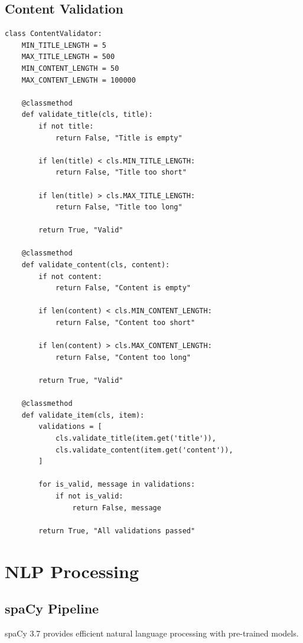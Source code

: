 \documentclass[12pt,a4paper]{report}
\begin{document}
\section{Content Validation}

\begin{lstlisting}
class ContentValidator:
    MIN_TITLE_LENGTH = 5
    MAX_TITLE_LENGTH = 500
    MIN_CONTENT_LENGTH = 50
    MAX_CONTENT_LENGTH = 100000
    
    @classmethod
    def validate_title(cls, title):
        if not title:
            return False, "Title is empty"
        
        if len(title) < cls.MIN_TITLE_LENGTH:
            return False, "Title too short"
        
        if len(title) > cls.MAX_TITLE_LENGTH:
            return False, "Title too long"
        
        return True, "Valid"
    
    @classmethod
    def validate_content(cls, content):
        if not content:
            return False, "Content is empty"
        
        if len(content) < cls.MIN_CONTENT_LENGTH:
            return False, "Content too short"
        
        if len(content) > cls.MAX_CONTENT_LENGTH:
            return False, "Content too long"
        
        return True, "Valid"
    
    @classmethod
    def validate_item(cls, item):
        validations = [
            cls.validate_title(item.get('title')),
            cls.validate_content(item.get('content')),
        ]
        
        for is_valid, message in validations:
            if not is_valid:
                return False, message
        
        return True, "All validations passed"
\end{lstlisting}

\chapter{NLP Processing}

\section{spaCy Pipeline}

spaCy 3.7 provides efficient natural language processing with pre-trained models.
\end{document}

